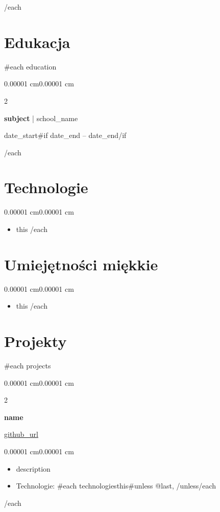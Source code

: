 \documentclass[10pt, letterpaper]{article}
\newenvironment{highlights}{
    \begin{itemize}[
        topsep=0.10 cm,
        parsep=0.10 cm,
        partopsep=0pt,
        itemsep=0pt,
        leftmargin=10pt
    ]
}{
    \end{itemize}
}
\newenvironment{onecolentry}{
    \begin{adjustwidth}{0.00001 cm}{0.00001 cm}
}{
    \end{adjustwidth}
}
\newenvironment{twocolentry}[2][]{
    \onecolentry
    \def\secondColumn{#2}
    \setcolumnwidth{\fill, 4.5 cm}
    \begin{paracol}{2}
}{
    \switchcolumn \raggedleft \secondColumn
    \end{paracol}
    \endonecolentry
}
\begin{document}
\vspace{0.2cm}
{{/each}}

\section{Edukacja}

{{#each education}}
\begin{twocolentry}{ {{date_start}}{{#if date_end}} -- {{date_end}}{{/if}} }
    \textbf{ {{subject}} }| {{school_name}}
\end{twocolentry}

\vspace{0.2cm}
{{/each}}

\section{Technologie}

\begin{onecolentry}
    \begin{highlights}
        {{#each technical_skills}}
        \item {{this}}
        {{/each}}
    \end{highlights}
\end{onecolentry}

\section{Umiejętności miękkie}

\begin{onecolentry}
    \begin{highlights}
        {{#each soft_skills}}
        \item {{this}}
        {{/each}}
    \end{highlights}
\end{onecolentry}

\section{Projekty}

{{#each projects}}
\begin{twocolentry}{\href{ {{github_url}} }{ {{github_url}} }}
    \textbf{ {{name}} }
\end{twocolentry}

\vspace{0.1cm}
\begin{onecolentry}
    \begin{highlights}
        \item {{description}}
        \item Technologie: {{#each technologies}}{{this}}{{#unless @last}}, {{/unless}}{{/each}}
    \end{highlights}
\end{onecolentry}
{{/each}}
\end{document}
